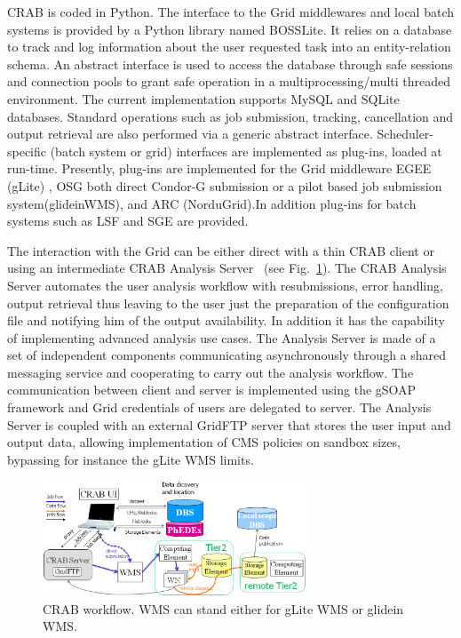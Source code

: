 CRAB is coded in Python. The interface to the Grid middlewares and local batch systems is provided by a Python library named BOSSLite\cite{RefBOSSLite}. It relies on a database to track and log information about the user requested task into an entity-relation schema.
An abstract interface is used to access the database through safe sessions and connection pools to grant safe operation in a multiprocessing/multi threaded environment. The current implementation supports MySQL and SQLite databases.
Standard operations such as job submission, tracking, cancellation and output retrieval are also performed via a generic abstract interface. Scheduler-specific (batch system or grid) interfaces are implemented as plug-ins, loaded at run-time. Presently, plug-ins are implemented for the Grid middleware EGEE (gLite) \cite{RefgLiteWMS}, OSG \cite{RefOSG} both direct Condor-G submission or a pilot based job submission system(glideinWMS\cite{Refglidein}), and ARC (NorduGrid)\cite{RefARC}.In addition plug-ins for batch systems such as LSF and SGE are provided.

The interaction with the Grid can be either direct with a thin CRAB client or using an intermediate CRAB Analysis Server~\cite{RefCRAB} (see Fig.~\ref{fig:CRABWorkflow}). The CRAB Analysis Server automates the user analysis workflow with resubmissions, error handling, output retrieval thus leaving to the user just the preparation of the configuration file and notifying him of the output availability. In addition it has the capability of implementing advanced analysis use cases.
The Analysis Server is made of a set of independent components communicating asynchronously through a shared messaging service and cooperating to carry out the analysis workflow. The communication between client and server is implemented using the gSOAP framework and Grid credentials of users are delegated to server.
The Analysis Server is coupled with an external GridFTP server %
 that stores the user input and output data, allowing implementation of CMS policies on sandbox sizes, bypassing for instance the gLite WMS limits.


\begin{figure}
 \includegraphics[width=0.70\textwidth]{CRABWorkflow.eps}
\caption{CRAB workflow. WMS can stand either for gLite WMS or glidein WMS.}
\label{fig:CRABWorkflow}
\end{figure}

